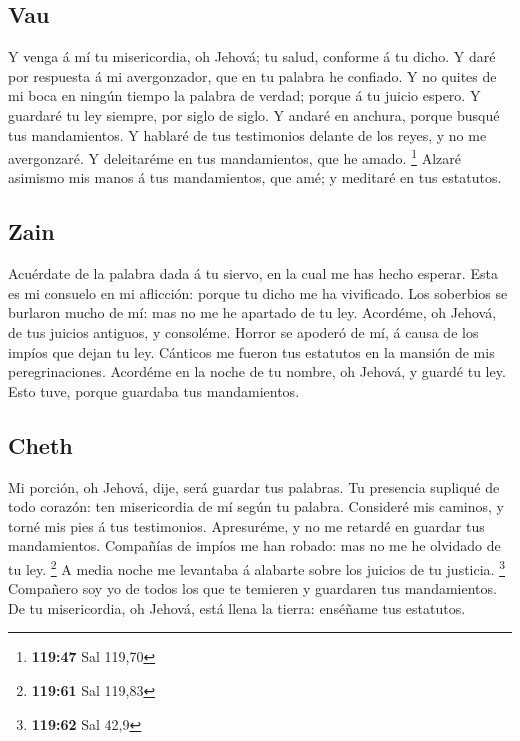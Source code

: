 \hypertarget{vau}{%
\subsection{Vau}\label{vau}}

 Y venga á mí tu misericordia, oh Jehová; tu salud,
conforme á tu dicho.  Y daré por respuesta á mi
avergonzador, que en tu palabra he confiado.  Y no quites
de mi boca en ningún tiempo la palabra de verdad; porque á tu juicio
espero.  Y guardaré tu ley siempre, por siglo de siglo.
 Y andaré en anchura, porque busqué tus mandamientos.
 Y hablaré de tus testimonios delante de los reyes, y no me
avergonzaré.  Y deleitaréme en tus mandamientos, que he
amado. \footnote{\textbf{119:47} Sal 119,70}  Alzaré
asimismo mis manos á tus mandamientos, que amé; y meditaré en tus
estatutos.

\hypertarget{zain}{%
\subsection{Zain}\label{zain}}

 Acuérdate de la palabra dada á tu siervo, en la cual me
has hecho esperar.  Esta es mi consuelo en mi aflicción:
porque tu dicho me ha vivificado.  Los soberbios se
burlaron mucho de mí: mas no me he apartado de tu ley. 
Acordéme, oh Jehová, de tus juicios antiguos, y consoléme. 
Horror se apoderó de mí, á causa de los impíos que dejan tu ley.
 Cánticos me fueron tus estatutos en la mansión de mis
peregrinaciones.  Acordéme en la noche de tu nombre, oh
Jehová, y guardé tu ley.  Esto tuve, porque guardaba tus
mandamientos.

\hypertarget{cheth}{%
\subsection{Cheth}\label{cheth}}

 Mi porción, oh Jehová, dije, será guardar tus palabras.
 Tu presencia supliqué de todo corazón: ten misericordia de
mí según tu palabra.  Consideré mis caminos, y torné mis
pies á tus testimonios.  Apresuréme, y no me retardé en
guardar tus mandamientos.  Compañías de impíos me han
robado: mas no me he olvidado de tu ley. \footnote{\textbf{119:61} Sal
  119,83}  A media noche me levantaba á alabarte sobre los
juicios de tu justicia. \footnote{\textbf{119:62} Sal 42,9}
 Compañero soy yo de todos los que te temieren y guardaren
tus mandamientos.  De tu misericordia, oh Jehová, está
llena la tierra: enséñame tus estatutos.

